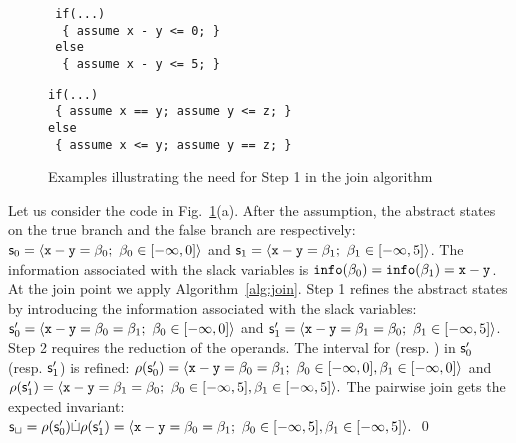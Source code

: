 \documentclass{llncs}
\begin{document}
\begin{figure}[t]
  \begin{subfloat}
    \begin{minipage}{4cm}
\begin{verbatim}
 if(...) 
  { assume x - y <= 0; } 
 else 
  { assume x - y <= 5; }
\end{verbatim}
    \end{minipage}
\caption{}    
  \end{subfloat}    
\qquad
  \begin{subfloat}
    \begin{minipage}{5cm}
\begin{verbatim}
if(...) 
 { assume x == y; assume y <= z; } 
else 
 { assume x <= y; assume y == z; }   
\end{verbatim}
\caption{}
    \end{minipage}
  \end{subfloat}
\vspace{-0.2cm}
\caption{Examples illustrating the need for Step 1 in the join algorithm }
\label{fig:example-join}
\vspace{-0.2cm}
\end{figure}

\begin{example}[Steps 1 \& 2]
Let us consider the code in Fig.~\ref{fig:example-join}(a).
After the assumption, the abstract states on the true branch and the false branch are respectively:
\(
\mathsf{\mathsf{s}}_0 =  \langle \mathtt{x} -\mathtt{y} = \beta_{0};\ \beta_{0} \in [-\infty, 0] \rangle\) and %
\(
\mathsf{\mathsf{s}}_1 = \langle \mathtt{x} -\mathtt{y} = \beta_{1};\ \beta_{1} \in [-\infty, 5] \rangle
\).
The  information associated  with the slack variables is $\mathtt{info}( \beta_{0}) = \mathtt{info}( \beta_{1}) = \mathtt{x} -\mathtt{y}$.
At the join point we apply Algorithm~\ref{alg:join}.
Step 1 refines the abstract states by introducing the information associated with the slack variables:
\(
\mathsf{\mathsf{s}}'_0  =  \langle \mathtt{x} -\mathtt{y} =  \beta_{0} =  \beta_{1};\  \beta_{0} \in [-\infty, 0] \rangle\) and %
\(
\subpoly'_1  = \tupla{\code{x} -\code{y} =  \slackvariable{1} =  \slackvariable{0};\ \slackvariable{1} \in [-\infty, 5]}
\).
Step 2 requires the reduction of the operands. 
The interval for    (resp.  ) in $\mathsf{\mathsf{s}}'_0$ (resp. $\mathsf{\mathsf{s}}'_1$) is refined:
\(
\rho(\mathsf{\mathsf{s}}'_0) =  \langle \mathtt{x} -\mathtt{y} =\beta_{0} = \beta_{1};\ \beta_{0} \in [-\infty, 0], \beta_{1} \in [-
\infty, 0] \rangle
\)
and
\(
\rho(\subpoly'_1) = \tupla{\code{x} -\code{y} = \slackvariable{1} = \slackvariable{0};\ \slackvariable{0} \in [-\infty, 5], \slackvariable{1} \in [-\infty, 5]}.
\)
The pairwise join gets the expected invariant:
\(
\mathsf{\mathsf{s}}_\sqcup = \rho(\mathsf{\mathsf{s}}'_0) \dot\sqcup \rho(\mathsf{\mathsf{s}}'_1) = \langle \mathtt{x} -\mathtt{y} = \beta_{0} = \beta_{1};\ \beta_{0}\in [-\infty, 5], \beta_{1} \in [-\infty, 5] \rangle. 
\) \qed
\end{example}
\end{document}
